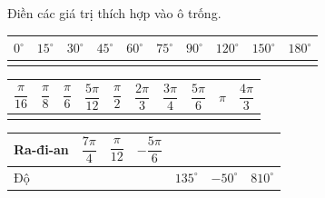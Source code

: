 \begin{bt}%

	Điền các giá trị thích hợp vào ô trống.
	\begin{center}
		\renewcommand{\arraystretch}{2}
		\begin{tabular}{|>{\centering\arraybackslash}m{1cm}|>{\centering\arraybackslash}m{1cm}|>{\centering\arraybackslash}m{1cm}|>{\centering\arraybackslash}m{1cm}|>{\centering\arraybackslash}m{1cm}|>{\centering\arraybackslash}m{1cm}|>{\centering\arraybackslash}m{1cm}|>{\centering\arraybackslash}m{1cm}|>{\centering\arraybackslash}m{1cm}|>{\centering\arraybackslash}m{1cm}|}
			\hline
			$0^\circ$ & $15^\circ$ & $30^\circ$ & $45^\circ$ & $60^\circ$ & $75^\circ$ & $90^\circ$ & $120^\circ$ & $150^\circ$ & $180^\circ$\\
			\hline
			&&&&&&&&&\\
			\hline
		\end{tabular}
	\end{center}
	\begin{center}
		\renewcommand{\arraystretch}{2}
		\begin{tabular}{|>{\centering\arraybackslash}m{1cm}|>{\centering\arraybackslash}m{1cm}|>{\centering\arraybackslash}m{1cm}|>{\centering\arraybackslash}m{1cm}|>{\centering\arraybackslash}m{1cm}|>{\centering\arraybackslash}m{1cm}|>{\centering\arraybackslash}m{1cm}|>{\centering\arraybackslash}m{1cm}|>{\centering\arraybackslash}m{1cm}|>{\centering\arraybackslash}m{1cm}|}
			\hline
			$\dfrac{\pi}{16}$ & $\dfrac{\pi}{8}$ & $\dfrac{\pi}{6}$ & $\dfrac{5\pi}{12}$ & $\dfrac{\pi}{2}$ & $\dfrac{2\pi}{3}$ & $\dfrac{3\pi}{4}$ & $\dfrac{5\pi}{6}$ & $\pi$ & $\dfrac{4\pi}{3}$\\
			\hline
			&&&&&&&&&\\
			\hline
		\end{tabular}
	\end{center}
	\begin{center}
		\renewcommand{\arraystretch}{2}
		\begin{tabular}{|>{\centering\arraybackslash}m{2cm}|>{\centering\arraybackslash}m{2cm}|>{\centering\arraybackslash}m{2cm}|>{\centering\arraybackslash}m{2cm}|>{\centering\arraybackslash}m{2cm}|>{\centering\arraybackslash}m{2cm}|>{\centering\arraybackslash}m{2cm}|}
			\hline
			Ra-đi-an & $\dfrac{7\pi}{4}$ & $\dfrac{\pi}{12}$ & $-\dfrac{5\pi}{6}$ & & & \\
			\hline
			Độ & & & & $135^\circ$ & $-50^\circ$ & $810^\circ$\\

\end{tabular}
\end{center}
\end{bt}

